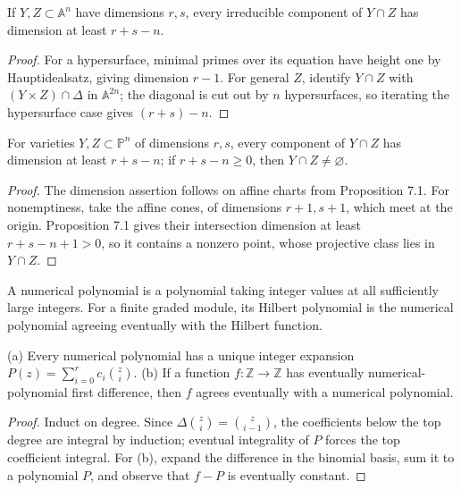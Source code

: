 \begin{proposition}
\label{prop:ha-ch1-7-1}
If $Y,Z\subset\mathbb A^n$ have dimensions $r,s$, every irreducible component of $Y\cap Z$ has
dimension at least $r+s-n$.
\end{proposition}
\begin{proof}
For a hypersurface, minimal primes over its equation have height one by Hauptidealsatz, giving
dimension $r-1$.  For general $Z$, identify $Y\cap Z$ with $(Y\times Z)\cap\Delta$ in
$\mathbb A^{2n}$; the diagonal is cut out by $n$ hypersurfaces, so iterating the hypersurface case
gives $(r+s)-n$.
\end{proof}

\begin{theorem}
\label{thm:ha-ch1-7-2}
For varieties $Y,Z\subset\mathbb P^n$ of dimensions $r,s$, every component of $Y\cap Z$ has
dimension at least $r+s-n$; if $r+s-n\ge0$, then $Y\cap Z\ne\varnothing$.
\end{theorem}
\begin{proof}
The dimension assertion follows on affine charts from Proposition 7.1.  For nonemptiness, take
the affine cones, of dimensions $r+1,s+1$, which meet at the origin.  Proposition 7.1 gives their
intersection dimension at least $r+s-n+1>0$, so it contains a nonzero point, whose projective class
lies in $Y\cap Z$.
\end{proof}

\begin{definition}
\label{def:ha-ch1-hilbert-polynomial}
A numerical polynomial is a polynomial taking integer values at all sufficiently large integers.
For a finite graded module, its Hilbert polynomial is the numerical polynomial agreeing eventually
with the Hilbert function.
\end{definition}

\begin{proposition}
\label{prop:ha-ch1-7-3}
(a) Every numerical polynomial has a unique integer expansion \(P(z)=\sum_{i=0}^r c_i\binom zi\).
(b) If a function $f:\mathbb Z\to\mathbb Z$ has eventually numerical-polynomial first difference,
then $f$ agrees eventually with a numerical polynomial.
\end{proposition}
\begin{proof}
Induct on degree.  Since \(\Delta\binom zi=\binom z{i-1}\), the coefficients below the top
degree are integral by induction; eventual integrality of $P$ forces the top coefficient integral.
For (b), expand the difference in the binomial basis, sum it to a polynomial $P$, and observe that
$f-P$ is eventually constant.
\end{proof}

